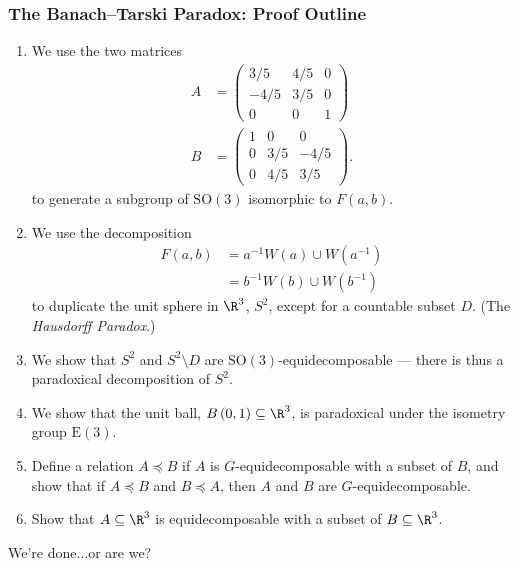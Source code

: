 \documentclass{beamer-custom}
\begin{document}
\begin{frame}[allowframebreaks]
  \frametitle{The Banach--Tarski Paradox: Proof Outline}
  \begin{enumerate}[(1)]
    \item We use the two matrices
      \begin{align*}
        A &= \begin{pmatrix}3/5 & 4/5 & 0 \\  -4/5 & 3/5 & 0 \\ 0 & 0 & 1\end{pmatrix}\\
        B &= \begin{pmatrix}1 & 0 & 0 \\ 0 & 3/5 & -4/5 \\ 0 & 4/5 & 3/5\end{pmatrix}.
      \end{align*}
      to generate a subgroup of $\text{SO}\left( 3 \right)$ isomorphic to $F(a,b)$.
    \item We use the decomposition 
      \begin{align*}
        F\left( a,b \right) &= a^{-1}W\left( a \right)\cup W\left( a^{-1} \right)\\
                            &= b^{-1}W\left( b \right) \cup W\left( b^{-1} \right)
      \end{align*}
      to duplicate the unit sphere in $\R^3$, $S^2$, except for a countable subset $D$. (The \textit{Hausdorff Paradox}.)
    \item We show that $S^2$ and $S^2\setminus D$ are $\text{SO}\left( 3 \right)$-equidecomposable --- there is thus a paradoxical decomposition of $S^2$.
    \item We show that the unit ball, $B\left( 0,1 \right)\subseteq \R^3$, is paradoxical under the isometry group $\text{E}\left( 3 \right)$.
    \item Define a relation $A\preceq B$ if $A$ is $G$-equidecomposable with a subset of $B$, and show that if $A\preceq B$ and $B\preceq A$, then $A$ and $B$ are $G$-equidecomposable.
    \item Show that $A\subseteq \R^3$ is equidecomposable with a subset of $B\subseteq \R^3$.\pause
  \end{enumerate}
  We're done...\pause or are we?
\end{frame}
\end{document}
